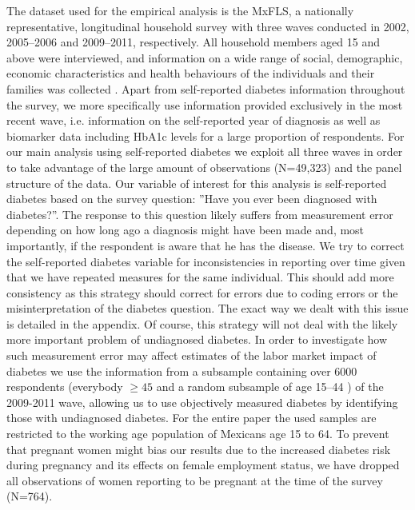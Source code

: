 \documentclass[12pt,english,british]{article}
\begin{document}
The dataset used for the empirical analysis is the \acf{MxFLS},
a nationally representative, longitudinal household survey with three
waves conducted in 2002, 2005--2006 and 2009--2011, respectively.
All household members aged 15 and above were interviewed, and information
on a wide range of social, demographic, economic characteristics and
health behaviours of the individuals and their families was collected
\citep{Rubalcava2013}. Apart from self-reported diabetes information
throughout the survey, we more specifically use information provided exclusively in the most recent wave, i.e. information
on the self-reported year of diagnosis as well as biomarker data including \ac{HbA1c} levels for a large proportion of respondents.  For our main analysis using self-reported diabetes we exploit all three waves in order to
take advantage of the large amount of observations (N=49,323) and the panel structure
of the data. Our variable of interest for this analysis is self-reported
diabetes based on the survey question: ''Have you
ever been diagnosed with diabetes?''. The response to this question
likely suffers from measurement error depending on how long ago a diagnosis
might have been made and, most importantly, if the respondent is aware
that he has the disease. We try to correct the self-reported diabetes variable for inconsistencies in reporting over time given that we have repeated measures for the same individual. This should add more consistency as this strategy should correct for errors due to coding errors or the misinterpretation of the diabetes question. The exact way we dealt with this issue is detailed in the appendix.  Of course, this strategy will not deal with the likely more important problem of undiagnosed diabetes. In order to investigate how such measurement
error may affect estimates of the labor market impact of diabetes
we use the information from a subsample containing over 6000 respondents (everybody $\geq 45$ and a random subsample of age 15--44 \citep{Crimmins2015}) of the 2009-2011 wave, allowing us to use objectively measured diabetes by identifying those with undiagnosed diabetes. For the entire paper the used samples are restricted to the working age population of Mexicans age 15 to 64. To prevent that pregnant women might bias our results due to the increased diabetes risk during pregnancy and its effects on female employment status, we have dropped all observations of women reporting to be pregnant at the time of the survey (N=764).
\end{document}
